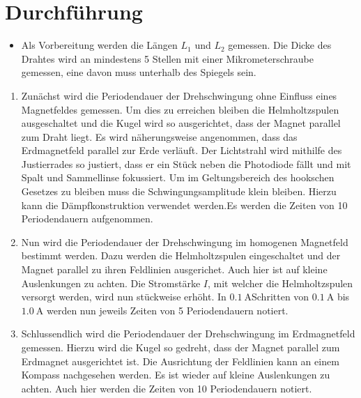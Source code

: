 
\section{Durchführung}
\label{sec:Durchführung}

\begin{itemize}
   \item Als Vorbereitung werden die Längen $L_1$ und $L_2$ gemessen. Die Dicke des
   Drahtes wird an mindestens 5 Stellen mit einer Mikrometerschraube gemessen,
   eine davon muss unterhalb des Spiegels sein.
\end{itemize}
\renewcommand{\labelenumi}{\alph{enumi})}

\begin{enumerate}
  \item Zunächst wird die Periodendauer der Drehschwingung ohne Einfluss
   eines Magnetfeldes gemessen. Um dies zu erreichen bleiben die Helmholtzspulen
    ausgeschaltet und die Kugel wird so ausgerichtet, dass der Magnet parallel zum Draht
    liegt. Es wird näherungsweise angenommen, dass das Erdmagnetfeld parallel zur Erde
    verläuft. Der Lichtstrahl wird mithilfe des Justierrades so justiert,
     dass er ein Stück neben die Photodiode fällt und mit Spalt und Sammellinse
      fokussiert. Um im Geltungsbereich des hookschen Gesetzes zu bleiben muss
       die Schwingungsamplitude klein bleiben. Hierzu kann die Dämpfkonstruktion
        verwendet werden.Es werden die Zeiten von 10 Periodendauern aufgenommen.

        \item Nun wird die Periodendauer der Drehschwingung im
         homogenen Magnetfeld bestimmt werden. Dazu werden die Helmholtzspulen
          eingeschaltet und der Magnet parallel zu ihren Feldlinien ausgerichet.
           Auch hier ist auf kleine Auslenkungen zu achten.
          Die Stromstärke $I$, mit welcher die Helmholtzspulen versorgt werden,
           wird nun stückweise erhöht. In $\SI{0.1}{\ampere}$Schritten von
           $\SI{0.1}{\ampere}$ bis $\SI{1.0}{\ampere}$ werden nun jeweils 
Zeiten von 5 Periodendauern notiert.

      \item Schlussendlich wird die Periodendauer der Drehschwingung im Erdmagnetfeld gemessen.
       Hierzu wird die Kugel so gedreht, dass der Magnet parallel zum Erdmagnet
        ausgerichtet ist. Die Ausrichtung der Feldlinien kann an einem Kompass
         nachgesehen werden. Es ist wieder auf kleine Auslenkungen zu achten.
          Auch hier werden die Zeiten von 10 Periodendauern notiert.



\end{enumerate}
